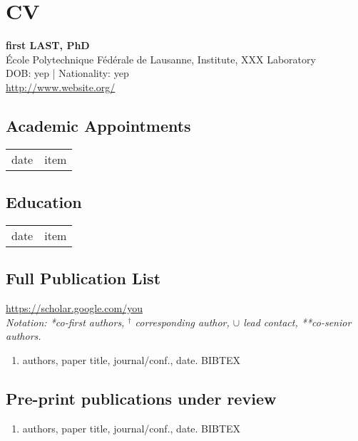 \chapter{CV}
\label{cv}

\vspace{-10mm}

\large \textbf{first LAST, PhD
}\\
École Polytechnique Fédérale de Lausanne, 
Institute,
XXX Laboratory	\\	
DOB: yep | Nationality: yep\\
\url{http://www.website.org/}

\section{Academic Appointments}							
\begin{tabular}[l]{ p{} p{} }
date & item\\
\end{tabular} 

\section{Education}								
\begin{tabular}[l]{ p{} p{} }
date & item\\
\end{tabular} 

\section{Full Publication List}	

\url{https://scholar.google.com/you}\\

\small \textit{Notation: *co-first authors, $^\dagger$ corresponding author, $\cup$ lead contact, **co-senior authors.}

\begin{enumerate}
\item authors, paper title, journal/conf., date. BIBTEX
\end{enumerate}

\section{Pre-print publications under review}
\begin{enumerate}
\item authors, paper title, journal/conf., date. BIBTEX
\end{enumerate}


